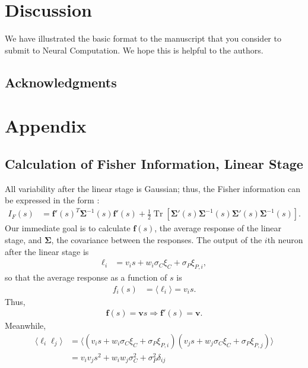 \documentclass[12pt]{article}
\DeclareMathOperator{\Tr}{Tr}
\begin{document}
\section{Discussion}
We have illustrated the basic format to the manuscript that you consider to submit to Neural Computation. We hope this is helpful to the authors.

\subsection*{Acknowledgments}


\section{Appendix}

\subsection{Calculation of  Fisher Information, Linear Stage}
All variability after the linear stage is Gaussian; thus, the Fisher information can be expressed in the form \citep{abbott1999, kay1993}:
\begin{align}
	I_{F}(s) &= \mathbf{f}'(s)^T \boldsymbol{\Sigma}^{-1} (s) \mathbf{f}'(s) + \frac{1}{2}\Tr\left[\boldsymbol{\Sigma}'(s) \boldsymbol{\Sigma}^{-1}(s)\boldsymbol{\Sigma}'(s) \boldsymbol{\Sigma}^{-1}(s)\right]. \label{IF-gaussian}
\end{align}
Our immediate goal is to calculate $\mathbf{f}(s)$, the average response of the linear stage, and $\boldsymbol{\Sigma}$, the covariance between the responses. The output of the $i$th neuron after the linear stage is
\begin{align}
	\ell_i &= v_i s + w_i \sigma_C \xi_C + \sigma_P\xi_{P,i},
\end{align}
so that the average response as a function of $s$ is
\begin{align}
	f_i(s) &= \langle \ell_i \rangle = v_i s.
\end{align}
Thus,
\begin{align}
	\mathbf{f}(s) = \mathbf{v}s \Rightarrow \mathbf{f}'(s) = \mathbf{v}.
\end{align}
Meanwhile,
	\begin{align}
	\langle \ell_i \ell_j \rangle &= \langle (v_i s + w_i \sigma_C\xi_C + \sigma_P\xi_{P,i}) (v_j s + w_j \sigma_C\xi_C + \sigma_P\xi_{P,j})\rangle \\
	&= v_i v_j s^2 + w_i w_j \sigma_C^2 + \sigma_P^2 \delta_{ij}
	\end{align}
\end{document}
